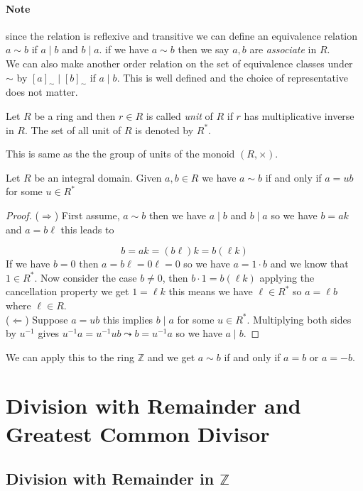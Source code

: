 \documentclass[16pt,a4paper]{article}
\theoremstyle{definition}
\begin{document}
\paragraph{Note} since the relation is reflexive and transitive we can define an equivalence relation $a\sim b$ if $a\mid b$ and $b\mid a$. if we have $a\sim b$ then we say $a,b$ are \emph{associate} in $R$. 
\\
We can also make another order relation on the set of equivalence classes under $\sim$ by  $[a]_\sim \mid [b]_\sim$ if $a\mid b$. This is well defined and the choice of representative does not matter.  

\begin{defn}{}{}
Let $R$ be a ring and then $r\in R$ is called \emph{unit} of $R$ if $r$ has multiplicative inverse in $R$. The set of all unit of $R$ is denoted by $R^\ast$.  
\end{defn}
This is same as the the group of units of the monoid $(R,\times)$. 

\begin{thm}{}{}
Let $R$ be an integral domain. Given $a,b\in R$ we have $a\sim b$ if and only if $a=ub$ for some $u\in R^\ast$
\end{thm}\label{thm5}

\begin{proof}
($\Rightarrow$) First assume, $a\sim b$ then we have $a\mid b$ and $b\mid a$ so we have $b=ak$ and $a=b\ell$ this leads to 

\[b=ak=(b\ell)k=b(\ell k)\]
If we have $b=0$ then $a=b\ell = 0\ell = 0$ so we have $a=1\cdot b$ and we know that $1\in R^\ast$. Now consider the case $b\neq 0$, then $b\cdot 1 = b(\ell k)$ applying the cancellation property we get $1 = \ell k$ this means we have $\ell \in R^\ast$ so $a=\ell b$ where $\ell \in R$. 
\\
($\Leftarrow$) Suppose $a=ub$ this implies $b\mid a$ for some $u\in R^*$. Multiplying both sides by $u^{-1}$ gives $u^{-1}a=u^{-1}ub\leadsto b=u^{-1}a$ so we have $a\mid b$.

\end{proof}
We can apply this to the ring $\mathbb{Z}$ and we get $a\sim b$ if and only if $a=b$ or $a=-b$. 

\newpage
\section{Division with Remainder and Greatest Common Divisor}
\subsection{Division with Remainder in $\mathbf{\mathds{Z}}$}
\end{document}
